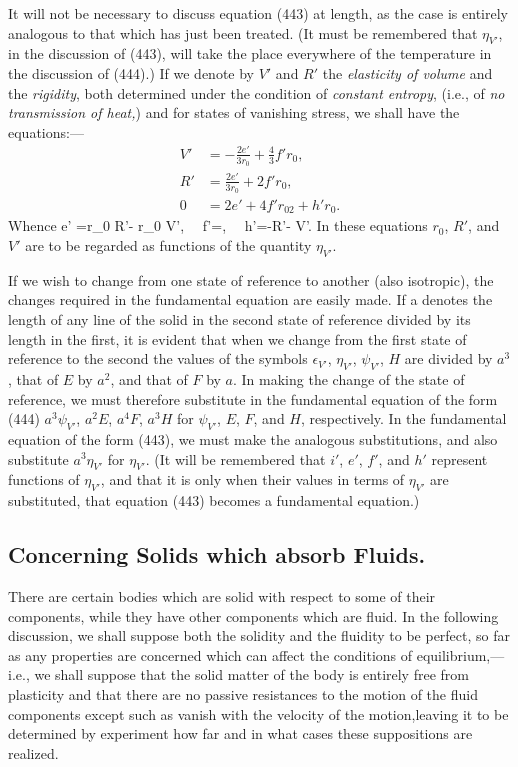 \documentclass[12pt]{memoir}
\begin{document}
{It will not be necessary to discuss equation (443) at length, as the case is entirely analogous to that which has just been treated. (It must be remembered that $\eta_{V'}$, in the discussion of (443), will take the place everywhere of the temperature in the discussion of (444).) If we denote by $V'$ and $R'$ the \textit{elasticity of volume} and the \textit{rigidity}, both determined under the condition of \textit{constant entropy}, (i.e., of \textit{no transmission of heat,}) and for states of vanishing stress, we shall have the equations:---
\begin{align} V' &= -\frac{2e'}{3r_0}+\frac{4}{3}f'r_0 ,\label{458} \\
 R' &= \frac{2e'}{3r_0} +2f'r_0,   \label{459} \\
 0 &= 2e' + 4f'r_02 + h'r_0. \label{460}\end{align}
Whence
\eqs e' =r_0 R'- r_0 V', \ \ f'=, \ \ h'=-R'- V'. \label{461}\eqe
In these equations $r_0$, $R'$, and $V'$ are to be regarded as functions of the quantity $\eta_{V'}$.


If we wish to change from one state of reference to another (also isotropic), the changes required in the fundamental equation are easily made. If a denotes the length of any line of the solid in the second state of reference divided by its length in the first, it is evident that when we change from the first state of reference to the second the values of the symbols $\epsilon_{V'}$, $\eta_{V'}$, $\psi_{V'}$, $H$ are divided by $a^3$, that of $E$ by $a^2$, and that of $F$ by $a$. In making the change of the state of reference, we must therefore substitute in the fundamental equation of the form  (444) $a^3 \psi_{V'}$, $a^2E$, $a^4F$, $a^3H$ for $\psi_{V'}$, $E$, $F$, and $H$, respectively. In the fundamental equation of the form (443), we must make the analogous substitutions, and also substitute $a^3\eta_{V'}$ for $\eta_{V'}$. (It will be remembered that $i'$, $e'$, $f'$, and $h'$ represent functions of $\eta_{V'}$, and that it is only when their values in terms of $\eta_{V'}$ are substituted, that equation (443) becomes a fundamental equation.)

\subsection{Concerning Solids which absorb Fluids.}
There are certain bodies which are solid with respect to some of their components, while they have other components which are fluid. In the following discussion, we shall suppose both the solidity and the fluidity to be perfect, so far as any properties are concerned which can affect the conditions of equilibrium,---i.e., we shall suppose that the solid matter of the body is entirely free from plasticity and that there are no passive resistances to the motion of the fluid components except such as vanish with the velocity of the motion,leaving it to be determined by experiment how far and in what cases these suppositions are realized.


}
\end{document}
